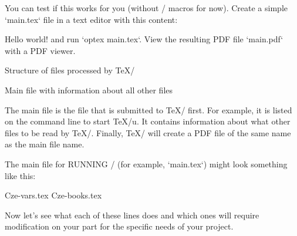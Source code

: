 {You can test if this works for you (without \OpBible/ macros for now). Create a simple `main.tex` file in a text editor with this content:

\begtt
\fontfam[lm]
Hello world!
\bye
\endtt
and run `optex main.tex`. View the resulting PDF file `main.pdf` with a PDF viewer.


\sec Structure of files processed by \TeX/

\secc[main] Main file with information about all other files

The main file is the file that is submitted to \TeX/ first. For example, it is
listed on the command line to start \TeX/u. It contains information about what
other files to be read by \TeX/. Finally, \TeX/ will create a PDF file of the same
name as the main file name.

The main file for RUNNING \OpBible/ (for example, `main.tex`) might look something like this:

\begtt
\load[opbible] %
\enlang %

\def\tmark {BBE} %

 {Cze-vars.tex} %
 {Cze-books.tex} %

\def\txsfile {sources/Eng\tmark-\amark.txs} %
\def\fmtfile {formats/fmt-Eng\tmark-\amark.tex} %
\def\notesfile {notes/notes-\amark.tex} %
\def\introfile {others/intro-\amark.tex} %
\def\articlefile {others/articles-\amark.tex} %

\def\printedbooks {%
 Gen Exod Lev Num Deut Josh Judg Ruth 1Sam 2Sam 1Kgs 2Kgs 1Chr 2Chr Ezra Neh Esth Job Ps 
 Prov Eccl Song Isa Jer Lam Ezek Dan Hos Joel Amos Obad Jonah Mic Nah Hab Zeph Hag Zech Mal    
 Matt Mark Luke John Acts Rom 1Cor 2Cor Gal Eph Phil Col 1Thess 2Thess 1Tim 2Tim Titus  
 Phlm Heb Jas 1Pet 2Pet 1John 2John 3John Jude Rev
}

\processbooks %
\bye
\endtt

Now let's see what each of these lines does and which ones will require modification on your part for the specific needs of your project.

}
